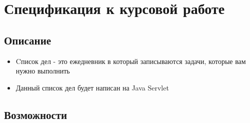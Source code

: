 \documentclass[a4paper,14pt]{extarticle} %
\begin{document}
\newpage
\section{Спецификация к курсовой работе} 
\subsection{Описание}
\begin{itemize}
    \item{Cписок дел - это ежедневник в который записываются задачи, которые вам нужно выполнить}
    \item{Данный список дел будет написан на Java Servlet}
\end{itemize}
\subsection{Возможности} 
\end{document}
